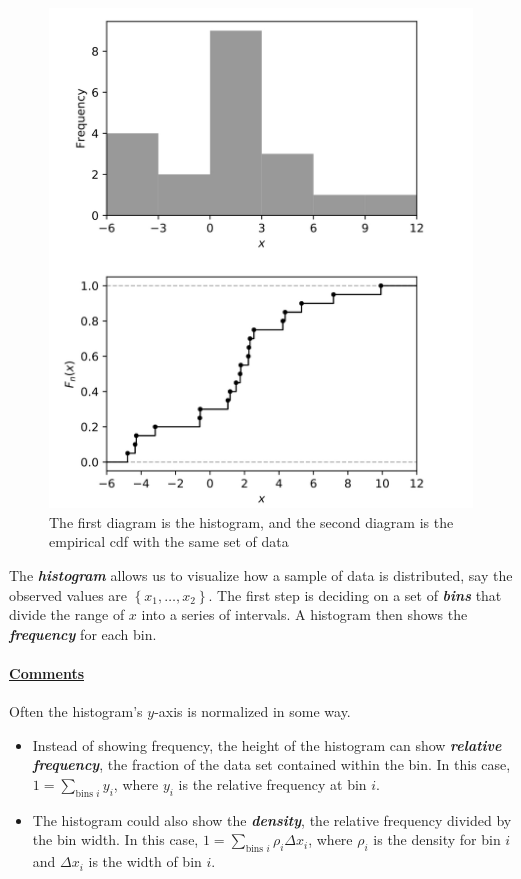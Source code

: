 \documentclass[12pt]{report}
\theoremstyle{definition}
\begin{document}
\begin{figure}
  	\includegraphics[scale=0.4]{./images/histogram_empirical_CDF.jpeg}
  	\centering
    \caption{The first diagram is the histogram, and the second diagram is the
    empirical cdf with the same set of data}\label{hist_cdf}
\end{figure}


\begin{theorem}
The \textbf{\emph{histogram}} allows us to visualize how a sample of data
is distributed, say the observed values are $\left\{x_1,\ldots,x_2\right\}$.
The first step is deciding on a set of \textbf{\emph{bins}} that divide the
range of $x$ into a series of intervals.
A histogram then shows the \textbf{\emph{frequency}} for each bin.
\end{theorem}
\paragraph{\underline{Comments}}
Often the histogram's $y$-axis is normalized in some way.
\begin{itemize}
    \item 
        Instead of showing frequency, the height of the histogram can show
        \textbf{\emph{relative frequency}}, the fraction of the data set contained within the
        bin. 
        In this case, $1=\sum_{\text{bins }i} y_i$, where $y_i$ is the relative
        frequency at bin $i$.
    \item 
        The histogram could also show the \textbf{\emph{density}}, the relative
        frequency divided by the bin width.
        In this case, $1=\sum_{\text{bins }i} \rho_i\Delta x_i$, where $\rho_i$
        is the density for bin $i$ and $\Delta x_i$ is the width of bin $i$.
\end{itemize} 
\end{document}
